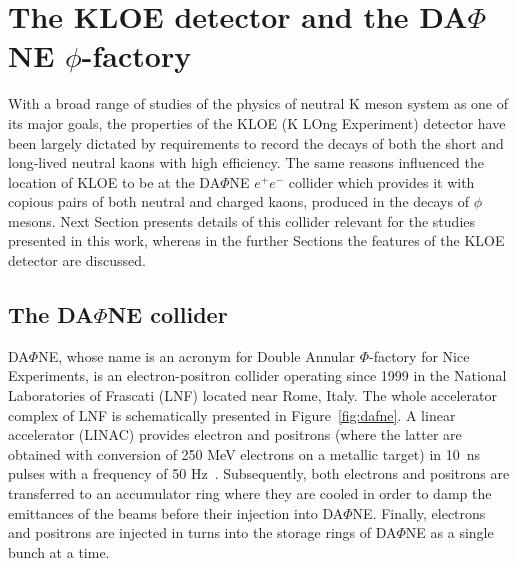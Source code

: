 \section{The KLOE detector and the DA$\Phi$NE $\phi$-factory}
With a broad range of studies of the physics of neutral K meson system as one of its major goals, the properties of the KLOE (K LOng Experiment) detector have been largely dictated by requirements to record the decays of both the short and long-lived neutral kaons with high efficiency. The same reasons influenced the location of KLOE to be at the DA$\Phi$NE $e^+e^-$ collider which provides it with copious pairs of both neutral and charged kaons, produced in the decays of $\phi$ mesons. Next Section presents details of this collider relevant for the studies presented in this work, whereas in the further Sections the features of the KLOE detector are discussed.

\subsection{The DA$\Phi$NE collider}
\label{sec:dafne}

DA$\Phi$NE, whose name is an acronym for Double Annular $\Phi$-factory for Nice Experiments, is an electron-positron collider operating since 1999 in the National Laboratories of Frascati (LNF) located near Rome, Italy. The whole accelerator complex of LNF is schematically presented in Figure~\ref{fig:dafne}. A linear accelerator (LINAC) provides electron and positrons (where the latter are obtained with conversion of 250 MeV electrons on a metallic target) in 10~ns pulses with a frequency of 50 Hz~\cite{Vignola:1996mt}. Subsequently, both electrons and positrons are transferred to an accumulator ring where they are cooled in order to damp the emittances of the beams before their injection into DA$\Phi$NE. Finally, electrons and positrons are injected in turns into the storage rings of DA$\Phi$NE as a single bunch at a time.

